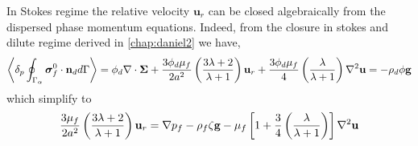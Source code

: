 In Stokes regime the relative velocity $\textbf{u}_r$ can be closed algebraically from the dispersed phase momentum equations.  
Indeed, from the closure in stokes and dilute regime derived in \ref{chap:daniel2} we have, 
\begin{equation*}
    \left<\delta_p \oint_{\Gamma_{\alpha}} \bm{\sigma}_f^0\cdot \textbf{n}_d d\Gamma\right> = 
    \phi_d \mathbf{\nabla}\cdot\bm\Sigma
    + \frac{3\phi_d\mu_f}{2 a^2} 
    \left(\frac{3\lambda+2}{\lambda+1}\right) \textbf{u}_{r} 
    + \frac{3\phi_d\mu_f}{4} \left(\frac{\lambda}{\lambda+1}\right)\mathbf{\nabla}^2\textbf{u}
    = - 
    \rho_d \phi \textbf{g}
\end{equation*}
which simplify to 
\begin{align*}
    \frac{3\mu_f}{2 a^2}\left(\frac{3\lambda+2}{\lambda+1}\right)
   \textbf{u}_{r} 
    = 
    \mathbf{\nabla} p_f
    - \rho_f\zeta   \textbf{g}
    -  \mu_f \left[
        1 + \frac{3}{4} \left(\frac{\lambda}{\lambda+1}\right)
        \right]\mathbf{\nabla}^2 \textbf{u}
\end{align*}


